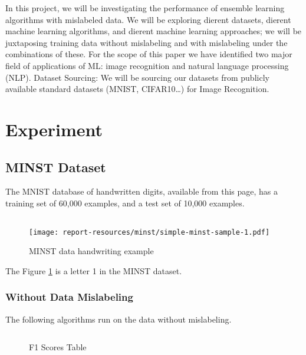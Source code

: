 \documentclass{article}
\begin{document}
In this project, we will be investigating the performance of ensemble learning algorithms with mislabeled data. We will be exploring dierent datasets, dierent machine learning algorithms, and dierent machine learning approaches; we will be juxtaposing training data without mislabeling and with mislabeling under the combinations of these.  
For the scope of this paper we have identified two major field of applications of ML: image recognition and natural language processing (NLP). 
Dataset Sourcing:
We will be sourcing our datasets from publicly available standard datasets (MNIST, CIFAR10…) for Image Recognition.


\section{Experiment}

\subsection{MINST Dataset}

The MNIST database of handwritten digits, available from this page, has a training set of 60,000 examples, and a test set of 10,000 examples. 

\inputminted[firstline=16,lastline=20,frame=single,framesep=10pt,fontsize=\footnotesize]{python}{minst/main.py}

\begin{figure}[H]
    \centering
    \texttt{[image: report-resources/minst/simple-minst-sample-1.pdf]}
    \caption{MINST data handwriting example}
    \label{fig:let1}
\end{figure}

The Figure \ref{fig:let1} is a letter 1 in the MINST dataset. 

\subsubsection{Without Data Mislabeling}

The following algorithms run on the data without mislabeling. 

\inputminted[firstline=30,lastline=77,frame=single,framesep=10pt,fontsize=\footnotesize]{python}{minst/main.py}

\begin{figure}[H]
    \centering
    
    \caption{F1 Scores Table}
\end{figure}
\end{document}
